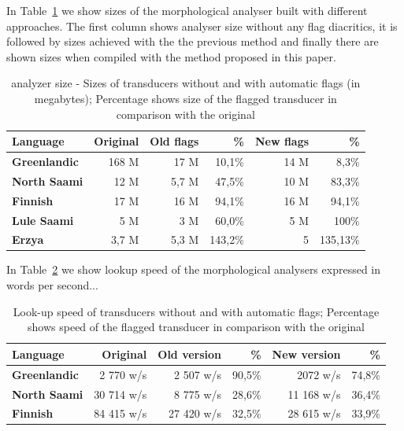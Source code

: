 \documentclass[11pt]{article}
\begin{document}
In Table~\ref{table:sizes} we show sizes of the morphological analyser built with different approaches. The first column shows analyser size without any flag diacritics, it is followed by sizes achieved with the the previous method and finally there are shown sizes when compiled with the method proposed in this paper.
\begin{table}
    \centering
    \begin{tabular}{|l|r|r|r|r|r|}
        \hline
        \bf Language & \bf Original & \bf Old flags  & \bf \% & \bf New flags  & \bf \% \\
        \hline\hline
        \bf Greenlandic &   168 M  & 17 M & 10,1\% &  14 M & 8,3\% \\
        \bf North Saami &   12 M    & 5,7 M & 47,5\% & 10 M & 83,3\% \\
        \bf Finnish &   17 M    & 16 M & 94,1\% & 16 M & 94,1\% \\
        \bf Lule Saami  &   5 M    & 3 M & 60,0\% & 5 M & 100\% \\
        \bf Erzya       &   3,7 M    & 5,3 M & 143,2\% &  5 & 135,13\% \\
        \hline
    \end{tabular}
    \caption{analyzer size - Sizes of transducers without and with automatic flags (in megabytes); Percentage shows size of the flagged transducer in comparison with the original
    \label{table:sizes}}
\end{table}

In Table~\ref{table:lookup} we show lookup speed of the morphological analysers expressed in words per second...

\begin{table}[h]
 \centering
    \begin{tabular}{|l|r|r|r|r|r|}
        \hline
        \bf Language & \bf Original & \bf Old version & \bf \% & \bf New version & \bf \% \\
        \hline\hline
        \bf Greenlandic & 2 770 w/s & 2 507 w/s & 90,5\% & 2072 w/s & 74,8\%  \\
        \bf North Saami & 30 714 w/s & 8 775 w/s & 28,6\% & 11 168 w/s & 36,4\%  \\
        \bf Finnish  & 84 415 w/s & 27 420 w/s & 32,5\%  & 28 615 w/s & 33,9\%  \\
        \hline
    \end{tabular}
    \caption{Look-up speed of transducers without and with automatic flags; Percentage shows speed of the flagged transducer in comparison with the original
    \label{table:lookup}}
\end{table}
\end{document}
